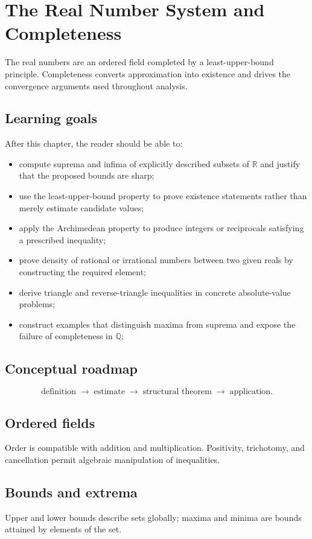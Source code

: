 \chapter{The Real Number System and Completeness}
\label{ch:ii01}

The real numbers are an ordered field completed by a least-upper-bound principle. Completeness converts approximation into existence and drives the convergence arguments used throughout analysis.

\section*{Learning goals}
After this chapter, the reader should be able to:
\begin{itemize}
\item compute suprema and infima of explicitly described subsets of \(\mathbb R\) and justify that the proposed bounds are sharp;
\item use the least-upper-bound property to prove existence statements rather than merely estimate candidate values;
\item apply the Archimedean property to produce integers or reciprocals satisfying a prescribed inequality;
\item prove density of rational or irrational numbers between two given reals by constructing the required element;
\item derive triangle and reverse-triangle inequalities in concrete absolute-value problems;
\item construct examples that distinguish maxima from suprema and expose the failure of completeness in \(\mathbb Q\);
\end{itemize}
\section*{Conceptual roadmap}
\[
\boxed{\text{definition}\;\longrightarrow\;\text{estimate}\;\longrightarrow\;\text{structural theorem}\;\longrightarrow\;\text{application}.}
\]

\section{Ordered fields}
Order is compatible with addition and multiplication. Positivity, trichotomy, and cancellation permit algebraic manipulation of inequalities.

\section{Bounds and extrema}
Upper and lower bounds describe sets globally; maxima and minima are bounds attained by elements of the set.

